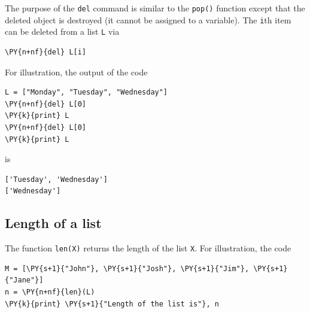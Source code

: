 \noindent
The purpose of the {\tt del} command is similar to the {\tt pop()} function
except that the deleted object is destroyed (it cannot be assigned to a variable).
The {\tt i}th item can be deleted from a list {\tt L} via \\

\begin{bbox}
\begin{Verbatim}[commandchars=\\\{\}]
\PY{n+nf}{del} L[i]
\end{Verbatim}
\end{bbox}
\vspace{6mm}

\noindent
For illustration, the output of the code \\

\begin{bbox}
\begin{Verbatim}[commandchars=\\\{\}]
L = ["Monday", "Tuesday", "Wednesday"]
\PY{n+nf}{del} L[0]
\PY{k}{print} L
\PY{n+nf}{del} L[0]
\PY{k}{print} L
\end{Verbatim}
\end{bbox}
\vspace{6mm}

\noindent
is \\

\begin{ybox}
\begin{Verbatim}[commandchars=\\\{\}]
['Tuesday', 'Wednesday']
['Wednesday']
\end{Verbatim}
\end{ybox}
\vspace{6mm}

\subsection[\ \ Length of a list]{Length of a list}

\noindent
The function {\tt len(X)} returns the length of the list {\tt X}.
For illustration, the code \\

\begin{bbox}
\begin{Verbatim}[commandchars=\\\{\}]
M = [\PY{s+1}{"John"}, \PY{s+1}{"Josh"}, \PY{s+1}{"Jim"}, \PY{s+1}{"Jane"}]
n = \PY{n+nf}{len}(L)
\PY{k}{print} \PY{s+1}{"Length of the list is"}, n
\end{Verbatim}
\end{bbox}
\vspace{6mm}

